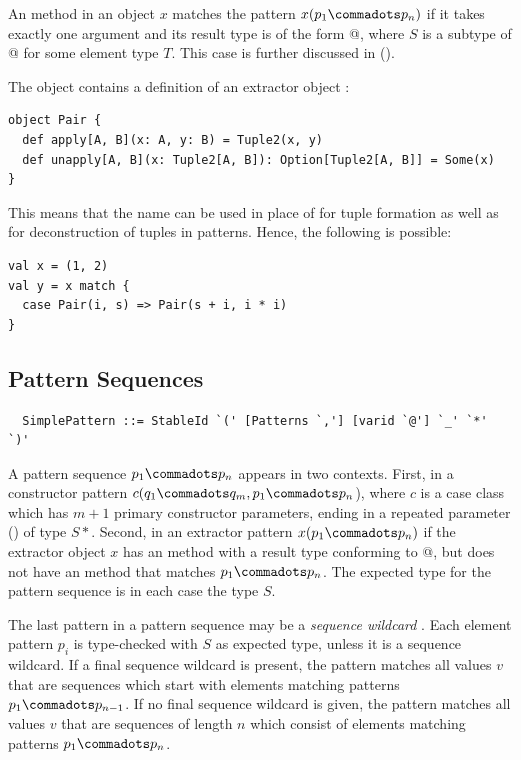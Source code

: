 An  method in an object $x$ matches the pattern
$x(p_1 \commadots p_n)$ if it takes exactly one argument and its
result type is of the form \lstinline@Option[$S$]@, where $S$ is a subtype of
\lstinline@Seq[$T$]@ for some element type $T$. 
This case is further discussed in ().

\example  The  object contains a definition of an
extractor object :
\begin{lstlisting}
object Pair {
  def apply[A, B](x: A, y: B) = Tuple2(x, y)
  def unapply[A, B](x: Tuple2[A, B]): Option[Tuple2[A, B]] = Some(x)
}
\end{lstlisting}
This means that the name  can be used in place of  for tuple 
formation as well as for deconstruction of tuples in patterns.
Hence, the following is possible:
\begin{lstlisting}
val x = (1, 2)
val y = x match {
  case Pair(i, s) => Pair(s + i, i * i)
}
\end{lstlisting}

\subsection{Pattern Sequences}\label{sec:pattern-seqs}

\syntax\begin{lstlisting}
  SimplePattern ::= StableId `(' [Patterns `,'] [varid `@'] `_' `*' `)'
\end{lstlisting}

A pattern sequence $p_1 \commadots p_n$ appears in two
contexts. First, in a constructor pattern
$c(q_1 \commadots q_m, p_1 \commadots p_n$), where $c$ is a case
class which has $m+1$ primary constructor parameters, 
ending in a repeated parameter () of type 
$S*$. Second, in an extractor pattern
$x(p_1 \commadots p_n)$ if the extractor object $x$ has an
 method with a result type conforming to 
\lstinline@Seq[$S$]@, but does not have an  method that 
matches $p_1 \commadots p_n$.
The expected type for the pattern sequence is in each case the type $S$.

The last pattern in a pattern sequence may be a {\em sequence
wildcard} \code{_*}. Each element pattern $p_i$ is type-checked with
$S$ as expected type, unless it is a sequence wildcard. If a final
sequence wildcard is present, the pattern matches all values $v$ that
are sequences which start with elements matching patterns
$p_1 \commadots p_{n-1}$.  If no final sequence wildcard is given, the
pattern matches all values $v$ that are sequences of
length $n$ which consist of elements matching patterns $p_1 \commadots
p_n$.

